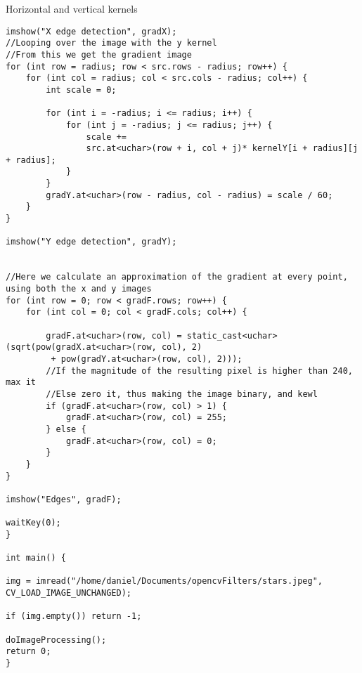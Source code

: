 \begin{listing}[H]
	\caption{Horizontal and vertical kernels}
	\label{listing:code2}
	\begin{verbatim}
imshow("X edge detection", gradX);
//Looping over the image with the y kernel
//From this we get the gradient image
for (int row = radius; row < src.rows - radius; row++) {
	for (int col = radius; col < src.cols - radius; col++) {
		int scale = 0;
		
		for (int i = -radius; i <= radius; i++) {
			for (int j = -radius; j <= radius; j++) {
				scale += 
				src.at<uchar>(row + i, col + j)* kernelY[i + radius][j + radius];
			}
		}
		gradY.at<uchar>(row - radius, col - radius) = scale / 60;
	}
}

imshow("Y edge detection", gradY);


//Here we calculate an approximation of the gradient at every point, using both the x and y images
for (int row = 0; row < gradF.rows; row++) {
	for (int col = 0; col < gradF.cols; col++) {
		
		gradF.at<uchar>(row, col) = static_cast<uchar>(sqrt(pow(gradX.at<uchar>(row, col), 2)
		 + pow(gradY.at<uchar>(row, col), 2)));
		//If the magnitude of the resulting pixel is higher than 240, max it
		//Else zero it, thus making the image binary, and kewl
		if (gradF.at<uchar>(row, col) > 1) {
			gradF.at<uchar>(row, col) = 255;
		} else {
			gradF.at<uchar>(row, col) = 0;
		}
	}
}

imshow("Edges", gradF);

waitKey(0);
}

int main() {

img = imread("/home/daniel/Documents/opencvFilters/stars.jpeg", CV_LOAD_IMAGE_UNCHANGED);

if (img.empty()) return -1;

doImageProcessing();
return 0;
}
\end{verbatim}
\end{listing}